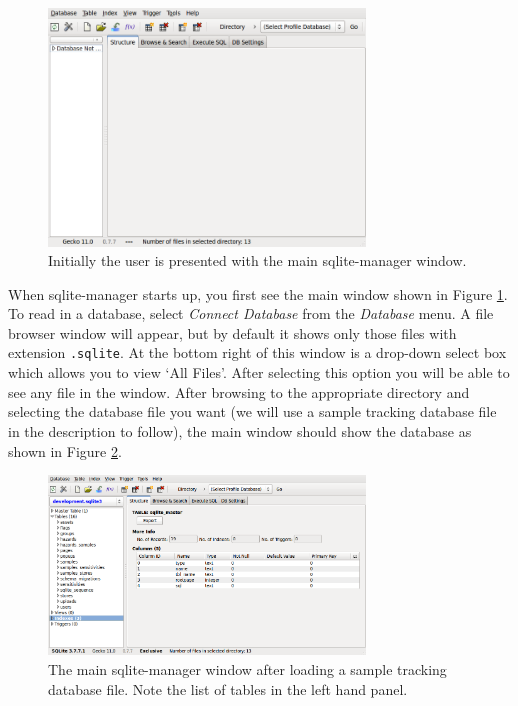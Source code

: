 \documentclass[12pt,twoside]{article}
\begin{document}
\begin{figure}[!htb]
\begin{center}
\includegraphics[width=0.75\textwidth]{sqlitemanwin}
\caption{Initially the user is presented with the main
sqlite-manager window. \label{fig:sqlitemanagerwindow}}
\end{center}
\end{figure}

When sqlite-manager starts up, you first see the main window shown
in Figure \ref{fig:sqlitemanagerwindow}.
To read in a database, select \emph{Connect Database} from the
\emph{Database} menu.
A file browser window will appear, but by default it shows only those
files with extension \verb=.sqlite=. At the bottom right of this window
is a drop-down select box which allows you to view `All Files'. After
selecting this option you will be able to see any file in the window.
After browsing to the appropriate directory and selecting the database file
you want (we will use a sample tracking database file in the description
to follow), the main window should show the database as shown in
Figure \ref{fig:sqlitemanagerdat}.

\begin{figure}[!htb]
\begin{center}
\includegraphics[width=0.75\textwidth]{sqlitemandat}
\caption{The main sqlite-manager window after loading a sample
tracking database file. Note the list of tables in the left hand panel.%
\label{fig:sqlitemanagerdat}}
\end{center}
\end{figure}
\end{document}
